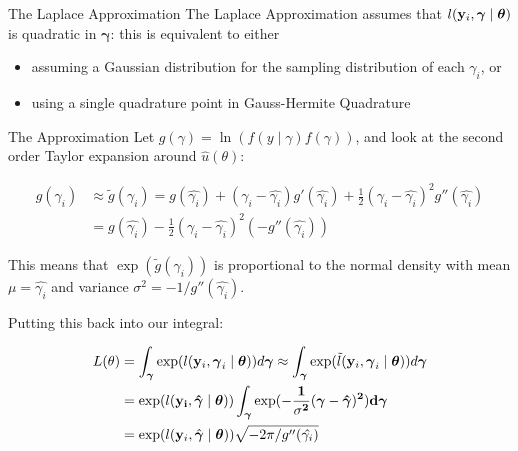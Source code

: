 \documentclass[
  ignorenonframetext,
]{beamer}
\providecommand{\tightlist}{%
  \setlength{\itemsep}{0pt}\setlength{\parskip}{0pt}}
\begin{document}
\begin{frame}
\begin{block}{The Laplace Approximation}
\protect{}\label{the-laplace-approximation}
The Laplace Approximation assumes that
\(l({\bf y}_i, \boldsymbol{\gamma} \mid {\boldsymbol \theta})\) is
quadratic in \(\boldsymbol{\gamma}\): this is equivalent to either

\begin{itemize}
\tightlist
\item
  assuming a Gaussian distribution for the sampling distribution of each
  \(\gamma_i\), or
\item
  using a single quadrature point in Gauss-Hermite Quadrature
\end{itemize}
\end{block}
\end{frame}

\begin{frame}
\begin{block}{The Approximation}
\protect{}\label{the-approximation}
Let \(g(\gamma)=\ln(f(y\mid \gamma)f(\gamma))\), and look at the second
order Taylor expansion around \(\hat{u}(\theta)\):

\[
\begin{aligned}
g(\gamma_i) &\approx \tilde{g}(\gamma_i)=g(\hat{\gamma_i})+(\gamma_i-\hat{\gamma_i})g'(\hat{\gamma_i})+
\frac{1}{2}(\gamma_i-\hat{\gamma_i})^2 g''(\hat{\gamma_i}) \\
&=g(\hat{\gamma_i})-\frac{1}{2}(\gamma_i-\hat{\gamma_i})^2 (-g''(\hat{\gamma_i}))
\end{aligned}
\]

This means that \(\exp(\tilde{g}(\gamma_i))\) is proportional to the
normal density with mean \(\mu=\hat{\gamma_i}\) and variance
\(\sigma^2=-1/g''(\hat{\gamma_i})\).

Putting this back into our integral:

\[
\begin{aligned}
L(\theta) &= \int_{\boldsymbol{\gamma}} \exp(l({\bf y}_i, \boldsymbol{\gamma}_i \mid {\boldsymbol \theta}))d\boldsymbol{\gamma} \approx\int_{\boldsymbol{\gamma}} \exp(\tilde{l}({\bf y}_i, \boldsymbol{\gamma}_i \mid {\boldsymbol \theta}))d\boldsymbol{\gamma} \\
&=\exp(l(\bf{y}_i, \hat{ {\boldsymbol \gamma}} \mid \boldsymbol{\theta}))
\int_{\boldsymbol{\gamma}} \exp(-\frac{1}{\sigma^2} (\boldsymbol{\gamma}-\hat{\boldsymbol{\gamma}})^2) d\boldsymbol{\gamma} \\
&=\exp(l({\bf y}_i, \hat{\boldsymbol{\gamma}} \mid {\boldsymbol \theta}))\sqrt{-2\pi/g''(\hat{\gamma_i})}
\end{aligned}
\]
\end{block}
\end{frame}
\end{document}
